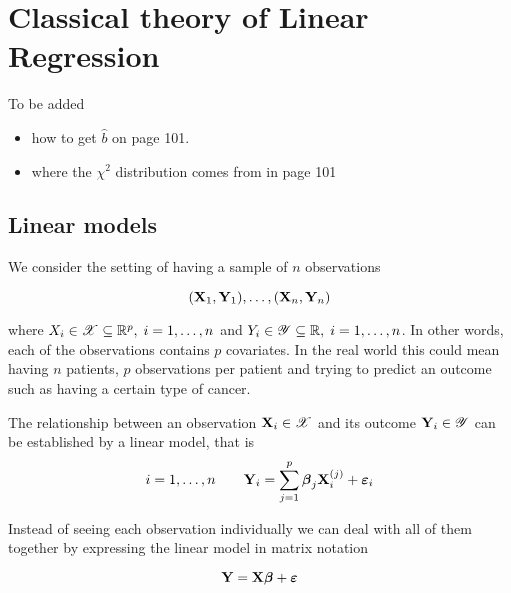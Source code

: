 \chapter{Classical theory of Linear Regression}

To be added
\begin{itemize}
    \item how to get $\hat b$ on page 101.
    \item where the $\chi^2$ distribution comes from in page 101
\end{itemize}

\section{Linear models}

We consider the setting of having a sample of $n$ observations

\[
    (\mathbf{X}_1, \mathbf{Y}_1), \ldots ,(\mathbf{X}_n, \mathbf{Y}_n)
\]

where $X_i \in \mathscr{X} \subseteq \mathbb{R}^p, \; i = 1, \ldots, n$ and $Y_i \in \mathscr{Y} \subseteq \mathbb{R}, \; i = 1, \ldots, n$. In other words, each of the observations contains $p$ covariates. In the real world this could mean having $n$ patients, $p$ observations per patient and trying to predict an outcome such as having a certain type of cancer.

\begin{definition}
    The relationship between an observation $\mathbf{X}_i \in \mathscr{X}$ and its outcome $\mathbf{Y}_i \in \mathscr{Y}$ can be established by a linear model, that is
    \begin{equation}
        i = 1, \ldots, n \qquad \mathbf{Y}_{i} = \sum_{j=1}^{p} \boldsymbol{\beta}_{j} \mathbf{X}_{i}^{(j)} + \boldsymbol{\varepsilon}_{i}
    \end{equation}
\end{definition}

Instead of seeing each observation individually we can deal with all of them together by expressing the linear model in matrix notation

\begin{equation}
    \label{eqn: linear model (matrix)}
    \mathbf{Y} = \mathbf{X} \boldsymbol{\beta} + \boldsymbol{\varepsilon}
\end{equation}

